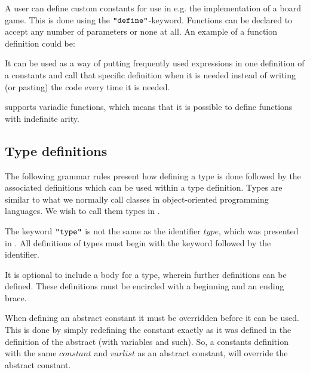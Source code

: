 A user can define custom constants for use in e.g. the implementation of a board game.
This is done using the $\texttt{"define"}$-keyword. Functions can be declared to accept
any number of parameters or none at all. An example of a function definition could
be:


It can be used as a way of putting frequently used expressions in one definition
of a constants and call that specific definition when it is needed instead of
writing (or pasting) the code every time it is needed. 

\productname{} supports variadic functions, which means that it is possible to define
functions with indefinite arity.


\subsection{Type definitions}
\label{sec:typedefinitions}

The following grammar rules present how defining a type is done followed by the
associated definitions which can be used within a type definition. Types are
similar to what we normally call classes in object-oriented programming
languages. We wish to call them types in \productname{}.

\begin{ebnf}
 
\end{ebnf}

The keyword $\texttt{"type"}$ is not the same as the identifier $type$, which was
presented in . All definitions of types must begin with
the keyword followed by the identifier.


It is optional to include a body for a type, wherein further definitions can be
defined. These definitions must be encircled with a beginning and an ending brace. 

When defining an abstract constant it must be overridden before it can be used.
This is done by simply redefining the constant exactly as it was defined in the
definition of the abstract (with variables and such). So, a constants definition
with the same $constant$ and $varlist$ as an abstract constant, will override
the abstract constant.

